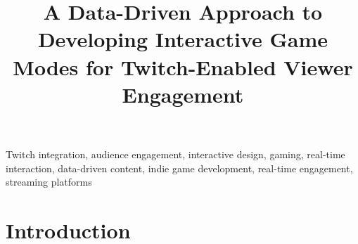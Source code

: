 \documentclass[conference]{IEEEtran}
\begin{document}
\title{A Data-Driven Approach to Developing Interactive Game Modes for Twitch-Enabled Viewer Engagement}

\author{
\and
{}
}

\maketitle

\thispagestyle{plain}
\pagestyle{plain}

\begin{abstract}
\end{abstract}

\begin{IEEEkeywords}
Twitch integration, audience engagement, interactive design, gaming, real-time interaction, data-driven content, indie game development, real-time engagement, streaming platforms
\end{IEEEkeywords}

\tableofcontents

\section{Introduction}\label{sec:intro}
\end{document}

